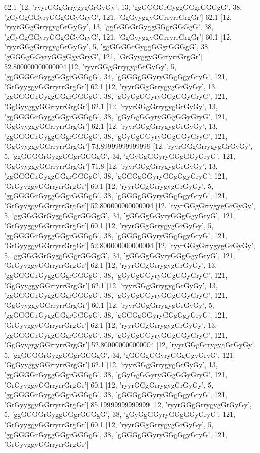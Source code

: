 62.1 [12, 'ryyrGGgGrrygygGrGyGy', 13, 'ggGGGGrGyggGGgrGGGgG', 38, 'gGyGgGGyryGGgGGyGryG', 121, 'GgGyyggyGGrryrrGrgGr']
62.1 [12, 'ryyrGGgGrrygygGrGyGy', 13, 'ggGGGGrGyggGGgrGGGgG', 38, 'gGyGgGGyryGGgGGyGryG', 121, 'GgGyyggyGGrryrrGrgGr']
60.1 [12, 'ryyrGGgGrrygygGrGyGy', 5, 'ggGGGGrGyggGGgrGGGgG', 38, 'gGGGgGGyryGGgGgyGryG', 121, 'GrGyyggyGGrryrrGrgGr']
52.800000000000004 [12, 'ryyrGGgGrrygygGrGyGy', 5, 'ggGGGGrGyggGGgrGGGgG', 34, 'gGGGgGGyryGGgGgyGryG', 121, 'GrGyyggyGGrryrrGrgGr']
62.1 [12, 'ryyrGGgGrrygygGrGyGy', 13, 'ggGGGGrGyggGGgrGGGgG', 38, 'gGyGgGGyryGGgGGyGryG', 121, 'GgGyyggyGGrryrrGrgGr']
62.1 [12, 'ryyrGGgGrrygygGrGyGy', 13, 'ggGGGGrGyggGGgrGGGgG', 38, 'gGyGgGGyryGGgGGyGryG', 121, 'GgGyyggyGGrryrrGrgGr']
62.1 [12, 'ryyrGGgGrrygygGrGyGy', 13, 'ggGGGGrGyggGGgrGGGgG', 38, 'gGyGgGGyryGGgGGyGryG', 121, 'GgGyyggyGGrryrrGrgGr']
73.89999999999999 [12, 'ryyrGGgGrrygygGrGyGy', 5, 'ggGGGGrGyggGGgrGGGgG', 34, 'gGyGgGGyryGGgGGyGryG', 121, 'GgGyyggyGGrryrrGrgGr']
71.8 [12, 'ryyrGGgGrrygygGrGyGy', 13, 'ggGGGGrGyggGGgrGGGgG', 38, 'gGGGgGGyryGGgGgyGryG', 121, 'GrGyyggyGGrryrrGrgGr']
60.1 [12, 'ryyrGGgGrrygygGrGyGy', 5, 'ggGGGGrGyggGGgrGGGgG', 38, 'gGGGgGGyryGGgGgyGryG', 121, 'GrGyyggyGGrryrrGrgGr']
52.800000000000004 [12, 'ryyrGGgGrrygygGrGyGy', 5, 'ggGGGGrGyggGGgrGGGgG', 34, 'gGGGgGGyryGGgGgyGryG', 121, 'GrGyyggyGGrryrrGrgGr']
60.1 [12, 'ryyrGGgGrrygygGrGyGy', 5, 'ggGGGGrGyggGGgrGGGgG', 38, 'gGGGgGGyryGGgGgyGryG', 121, 'GrGyyggyGGrryrrGrgGr']
52.800000000000004 [12, 'ryyrGGgGrrygygGrGyGy', 5, 'ggGGGGrGyggGGgrGGGgG', 34, 'gGGGgGGyryGGgGgyGryG', 121, 'GrGyyggyGGrryrrGrgGr']
62.1 [12, 'ryyrGGgGrrygygGrGyGy', 13, 'ggGGGGrGyggGGgrGGGgG', 38, 'gGyGgGGyryGGgGGyGryG', 121, 'GgGyyggyGGrryrrGrgGr']
62.1 [12, 'ryyrGGgGrrygygGrGyGy', 13, 'ggGGGGrGyggGGgrGGGgG', 38, 'gGyGgGGyryGGgGGyGryG', 121, 'GgGyyggyGGrryrrGrgGr']
60.1 [12, 'ryyrGGgGrrygygGrGyGy', 5, 'ggGGGGrGyggGGgrGGGgG', 38, 'gGGGgGGyryGGgGgyGryG', 121, 'GrGyyggyGGrryrrGrgGr']
62.1 [12, 'ryyrGGgGrrygygGrGyGy', 13, 'ggGGGGrGyggGGgrGGGgG', 38, 'gGyGgGGyryGGgGGyGryG', 121, 'GgGyyggyGGrryrrGrgGr']
52.800000000000004 [12, 'ryyrGGgGrrygygGrGyGy', 5, 'ggGGGGrGyggGGgrGGGgG', 34, 'gGGGgGGyryGGgGgyGryG', 121, 'GgGyyggyGGrryrrGrgGr']
62.1 [12, 'ryyrGGgGrrygygGrGyGy', 13, 'ggGGGGrGyggGGgrGGGgG', 38, 'gGyGgGGyryGGgGGyGryG', 121, 'GrGyyggyGGrryrrGrgGr']
60.1 [12, 'ryyrGGgGrrygygGrGyGy', 5, 'ggGGGGrGyggGGgrGGGgG', 38, 'gGGGgGGyryGGgGgyGryG', 121, 'GrGyyggyGGrryrrGrgGr']
85.19999999999999 [12, 'ryyrGGgGrrygygGrGyGy', 5, 'ggGGGGrGyggGGgrGGGgG', 38, 'gGyGgGGyryGGgGGyGryG', 121, 'GrGyyggyGGrryrrGrgGr']
60.1 [12, 'ryyrGGgGrrygygGrGyGy', 5, 'ggGGGGrGyggGGgrGGGgG', 38, 'gGGGgGGyryGGgGgyGryG', 121, 'GrGyyggyGGrryrrGrgGr']
